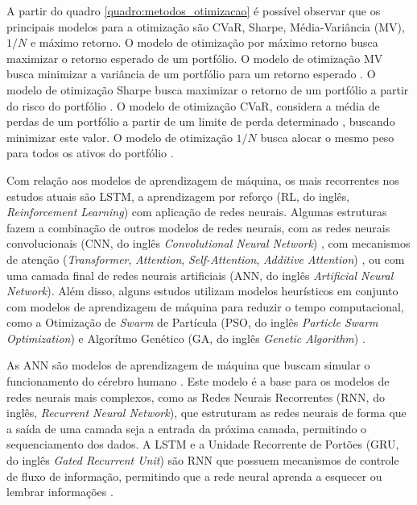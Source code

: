             \ipar A partir do quadro \ref{quadro:metodos_otimizacao} é possível observar que os principais modelos para a otimização são \acrshort{CVaR}, Sharpe, Média-Variância (\acrshort{MV}), $1/N$ e máximo retorno. O modelo de otimização por máximo retorno busca maximizar o retorno esperado de um portfólio. O modelo de otimização \acrshort{MV} busca minimizar a variância de um portfólio para um retorno esperado \cite{markowitz1952portfolio}. O modelo de otimização Sharpe busca maximizar o retorno de um portfólio a partir do risco do portfólio \cite{sharpe1994sharpe}. O modelo de otimização \acrshort{CVaR}, considera a média de perdas de um portfólio a partir de um limite de perda determinado \cite{uryasev2000conditional}, buscando minimizar este valor. O modelo de otimização $1/N$ busca alocar o mesmo peso para todos os ativos do portfólio \cite{demiguel2009optimal}.

            \ipar Com relação aos modelos de aprendizagem de máquina, os mais recorrentes nos estudos atuais são \acrshort{LSTM}, a aprendizagem por reforço (\acrshort{RL}, do inglês, \textit{Reinforcement Learning}) com aplicação de redes neurais. Algumas estruturas fazem a combinação de outros modelos de redes neurais, com as redes neurais convolucionais (CNN, do inglês \textit{Convolutional Neural Network}) \cite{weng2020portfolio} \cite{daiya2021stock}\cite{chaweewanchon2022markowitz} \cite{gao2022novel}, com mecanismos de atenção (\textit{Transformer}, \textit{Attention}, \textit{Self-Attention}, \textit{Additive Attention})\cite{cao2020delafo} \cite{weng2020portfolio} \cite{daiya2021stock}\cite{leow2021robo} \cite{du2022mean} \cite{kisiel2023portfolio}, ou com uma camada final de redes neurais artificiais (ANN, do inglês \textit{Artificial Neural Network}). Além disso, alguns estudos utilizam modelos heurísticos em conjunto com modelos de aprendizagem de máquina para reduzir o tempo computacional, como a Otimização de \textit{Swarm} de Partícula (\acrshort{PSO}, do inglês \textit{Particle Swarm Optimization}) e Algorítmo Genético (\acrshort{GA}, do inglês \textit{Genetic Algorithm}) \cite{maree2022balancing}\cite{jia2022policy}\cite{solares2022comprehensive}\cite{aithal2023real}.

            \ipar As \acrshort{ANN} são modelos de aprendizagem de máquina que buscam simular o funcionamento do cérebro humano \cite{rosenblatt1958perceptron}. Este modelo é a base para os modelos de redes neurais mais complexos, como as Redes Neurais Recorrentes (\acrshort{RNN}, do inglês, \textit{Recurrent Neural Network}), que estruturam as redes neurais de forma que a saída de uma camada seja a entrada da próxima camada, permitindo o sequenciamento dos dados. A \acrshort{LSTM} e a Unidade Recorrente de Portões (\acrshort{GRU}, do inglês \textit{Gated Recurrent Unit}) são \acrshort{RNN} que possuem mecanismos de controle de fluxo de informação, permitindo que a rede neural aprenda a esquecer ou lembrar informações \cite{hochreiter1997long}\cite{cho2014learning}. 

